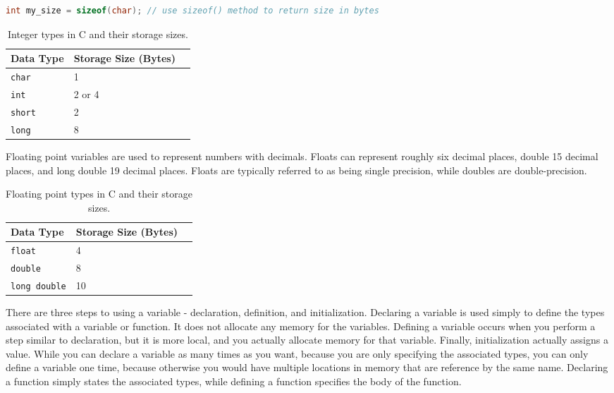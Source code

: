 \documentclass[10pt]{article}
\begin{document}
\begin{lstlisting}[language=C]
int my_size = sizeof(char); // use sizeof() method to return size in bytes
\end{lstlisting}

\begin{table}[h]
\caption{Integer types in C and their storage sizes.}
\centering
\begin{tabular}{l l l}
\hline\hline
Data Type & Storage Size (Bytes) \\ [0.5ex]
\hline
{\tt char} & 1 \\
{\tt int} & 2 or 4 \\
{\tt short} & 2 \\
{\tt long} & 8 \\
\hline
\end{tabular}
\end{table}

Floating point variables are used to represent numbers with decimals. Floats can represent roughly six decimal places, double 15 decimal places, and long double 19 decimal places. Floats are typically referred to as being single precision, while doubles are double-precision. 

\begin{table}[h]
\caption{Floating point types in C and their storage sizes.}
\centering
\begin{tabular}{l l l}
\hline\hline
Data Type & Storage Size (Bytes) \\ [0.5ex]
\hline
{\tt float} & 4 \\
{\tt double} & 8  \\
{\tt long double} & 10 \\
\hline
\end{tabular}
\end{table}

There are three steps to using a variable - declaration, definition, and initialization. Declaring a variable is used simply to define the types associated with a variable or function. It does not allocate any memory for the variables. Defining a variable occurs when you perform a step similar to declaration, but it is more local, and you actually allocate memory for that variable. Finally, initialization actually assigns a value. While you can declare a variable as many times as you want, because you are only specifying the associated types, you can only define a variable one time, because otherwise you would have multiple locations in memory that are reference by the same name. Declaring a function simply states the associated types, while defining a function specifies the body of the function. 
\end{document}
